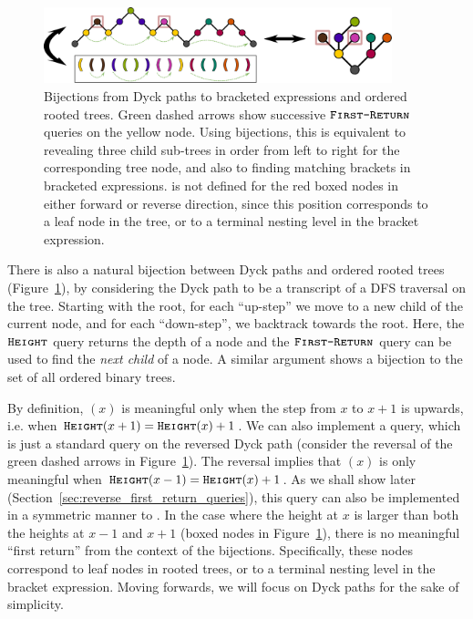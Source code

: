 \label{sec:bijections_to_other_catalan_objects}
\begin{figure}[htbp]
    \centering
    \includegraphics[width=0.9\textwidth]{images/dyck_tree_bijection.pdf}
    \caption{Bijections from Dyck paths to bracketed expressions and ordered rooted trees.
    Green dashed arrows show successive $\texttt{\textsc{First-Return}}$ queries on the yellow node.
    Using bijections, this is equivalent to revealing three child sub-trees in order from left to right for the corresponding tree node,
    and also to finding matching brackets in bracketed expressions.
     is not defined for the red boxed nodes in either forward or reverse direction,
    since this position corresponds to a leaf node in the tree, or to a terminal nesting level in the bracket expression.}
    \label{fig:dyck_bijection}
\end{figure}
There is also a natural bijection between Dyck paths and ordered rooted trees (Figure~\ref{fig:dyck_bijection}),
by considering the Dyck path to be a transcript of a DFS traversal on the tree.
Starting with the root, for each ``up-step'' we move to a new child of the current node, and for each ``down-step'', we backtrack towards the root.
Here, the $\texttt{\textsc{Height}}$ query returns the depth of a node and the $\texttt{\textsc{First-Return}}$ query can be used to find the \emph{next child} of a node.
A similar argument shows a bijection to the set of all ordered binary trees.

By definition, $(x)$ is meaningful only when the step from $x$ to $x+1$ is upwards,
i.e. when $\texttt{\textsc{Height}}(x+1) = \texttt{\textsc{Height}}(x) + 1$.
We can also implement a  query, which is just a standard  query on the reversed Dyck path
(consider the reversal of the green dashed arrows in Figure~\ref{fig:dyck_bijection}).
The reversal implies that $(x)$ is only meaningful when $\texttt{\textsc{Height}}(x-1) = \texttt{\textsc{Height}}(x) + 1$.
As we shall show later (Section~\ref{sec:reverse_first_return_queries}),
this query can also be implemented in a symmetric manner to .
In the case where the height at $x$ is larger than both the heights at $x-1$ and $x+1$ (boxed nodes in Figure~\ref{fig:dyck_bijection}),
there is no meaningful ``first return'' from the context of the bijections.
Specifically, these nodes correspond to leaf nodes in rooted trees, or to a terminal nesting level in the bracket expression.
Moving forwards, we will focus on Dyck paths for the sake of simplicity.



